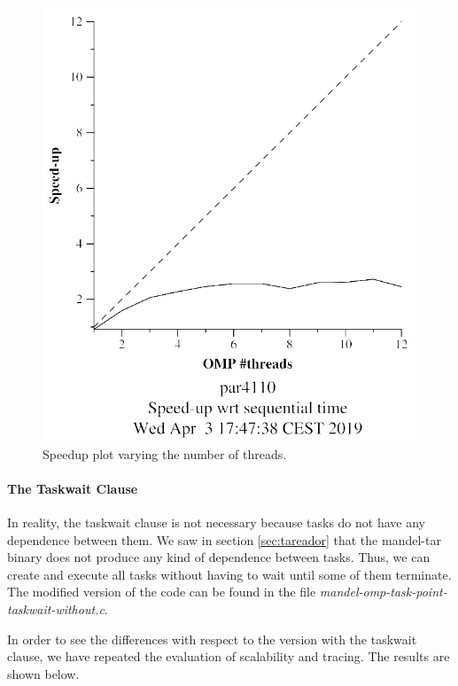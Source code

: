 \documentclass[12pt, a4paper]{article}
\begin{document}
\begin{figure}[H]
\begin{minipage}[b]{0.4\linewidth}
  \includegraphics[scale=0.5]{./mandel-omp-10000-strong-22-speedup}
  \caption{Speedup plot varying the number of threads.}
  \label{fig:mandel-omp-10000-strong-22-speedup}
\end{minipage}
\end{figure}

\paragraph{The Taskwait Clause}

\hfill

In reality, the taskwait clause is not necessary because tasks do not have any dependence between them. We saw in section \ref{sec:tareador} that the mandel-tar binary does not produce any kind of dependence between tasks. Thus, we can create and execute all tasks without having to wait until some of them terminate. The modified version of the code can be found in the file \textit{mandel-omp-task-point-taskwait-without.c}.

In order to see the differences with respect to the version with the taskwait clause, we have repeated the evaluation of scalability and tracing. The results are shown below.
\end{document}
